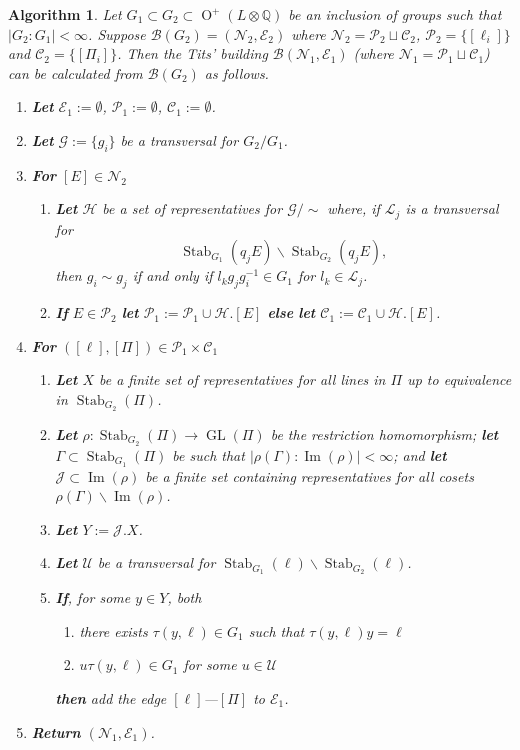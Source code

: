 \documentclass[12pt, a4paper]{article}
\newtheorem{algo}{Algorithm}[section]
\newcommand{\QQ}{\mathbb{Q}}
\newcommand{\beq}{\begin{equation*}}
\newcommand{\eeq}{\end{equation*}}
\newcommand{\bc}{\mathcal{B}}
\newcommand{\cc}{\mathcal{C}}
\newcommand{\ec}{\mathcal{E}}
\newcommand{\gc}{\mathcal{G}}
\newcommand{\hc}{\mathcal{H}}
\newcommand{\jc}{\mathcal{J}}
\newcommand{\lc}{\mathcal{L}}
\newcommand{\nc}{\mathcal{N}}
\newcommand{\pc}{\mathcal{P}}
\newcommand{\uc}{\mathcal{U}}
\newcommand{\opn}{\operatorname}
\begin{document}
\begin{algo}\label{TitsAlgo}
  Let $G_1 \subset G_2 \subset \opn{O}^+(L \otimes \QQ)$ be an inclusion of groups such that $\vert G_2 : G_1 \vert < \infty$.
  Suppose $\bc(G_2) = (\nc_2, \ec_2)$ where $\nc_2 = \pc_2 \sqcup \cc_2$, $\pc_2 = \{[\ell_i] \}$ and $\cc_2 = \{ [\Pi_i] \}$.
  Then the Tits' building $\bc(\nc_1, \ec_1)$ (where $\nc_1 = \pc_1 \sqcup \cc_1$) can be calculated from $\bc(G_2)$ as follows.
  \begin{enumerate}
  \item \textbf{Let}
    $\ec_1 := \emptyset$,
    $\pc_1 := \emptyset$,
    $\cc_1 := \emptyset$. \label{init}
  \item \textbf{Let} $\gc:=\{g_i\}$ be a transversal for $G_2/G_1$.
  \item \label{nodes} \textbf{For} $[E] \in \nc_2$
    \begin{enumerate}
    \item \textbf{Let} $\hc$ be a set of representatives for $\gc/\sim$ where, if $\lc_j$ is a transversal for
\beq
\opn{Stab}_{G_1}(q_jE) \backslash \opn{Stab}_{G_2}(q_j E),
\eeq
then $g_i \sim g_j$ if and only if $l_k g_j g_i^{-1} \in G_1$ for $l_k \in \lc_j$.
    \item \textbf{If} $E \in \pc_2$
     \textbf{let} $\pc_1:=\pc_1 \cup \hc.[E]$
     \textbf{else}
     \textbf{let} $\cc_1 := \cc_1 \cup \hc.[E]$.
    \end{enumerate}
  \item \label{edges} \textbf{For} $([\ell], [\Pi]) \in \pc_1 \times \cc_1$
    \begin{enumerate}
    \item \textbf{Let} $X$ be a finite set of representatives for all lines in $\Pi$ up to equivalence in $\opn{Stab}_{G_2}(\Pi)$.
    \item \textbf{Let} $\rho: \opn{Stab}_{G_2}(\Pi) \rightarrow \opn{GL}(\Pi)$ be the restriction homomorphism;
      \textbf{let} $\Gamma \subset \opn{Stab}_{G_1}(\Pi)$ be such that $\vert \rho(\Gamma) : \opn{Im}(\rho) \vert < \infty$;
      and \textbf{let} $\jc \subset \opn{Im}(\rho)$ be a finite set containing representatives for all cosets $\rho(\Gamma) \backslash \opn{Im}(\rho)$.
    \item \textbf{Let} $Y := \jc .X$.
    \item \textbf{Let} $\uc$ be a transversal for $\opn{Stab}_{G_1}(\ell) \backslash \opn{Stab}_{G_2}(\ell)$.
    \item \textbf{If}, for some $y \in Y$, both
      \begin{enumerate}
      \item there exists $\tau(y, \ell) \in G_1$ such that $\tau(y, \ell)y = \ell$
      \item $u \tau(y, \ell) \in G_1$ for some $u \in \uc$
      \end{enumerate}
      \textbf{then} add the edge $[\ell]$---$[\Pi]$ to $\ec_1$. 
    \end{enumerate}
  \item \textbf{Return} $(\nc_1, \ec_1)$.
  \end{enumerate}
\end{algo}
\end{document}
